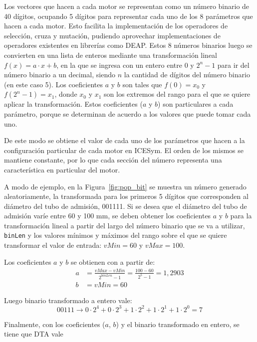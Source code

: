 Los vectores que hacen a cada motor se representan como un número binario de 40
dígitos, ocupando 5 dígitos para representar cada uno de los 8 parámetros que
hacen a cada motor.
%
Esto facilita la implementación de los operadores de selección, cruza y
mutación, pudiendo aprovechar implementaciones de operadores existentes en
librerías como DEAP.
%
Estos 8 números binarios luego se convierten en una lista de enteros mediante
una transformación lineal $f(x)=a\cdot x+b$, en la que se ingresa con un entero
entre 0 y $2^{n}-1$ para ir del número binario a un decimal, siendo $n$ la
cantidad de dígitos del número binario (en este caso 5).
%
Los coeficientes $a$ y $b$ son tales que $f(0)=x_{0}$ y $f(2^{n}-1) = x_{1}$,
donde $x_{0}$ y $x_{1}$ son los extremos del rango para el que se quiere aplicar
la transformación.
%
Estos coeficientes ($a$ y $b$) son particulares a cada parámetro, porque se
determinan de acuerdo a los valores que puede tomar cada uno.

De este modo se obtiene el valor de cada uno de los parámetros que hacen a la
configuración particular de cada motor en ICESym.
%
El orden de los mismos se mantiene constante, por lo que cada sección del número
representa una característica en particular del motor.

A modo de ejemplo, en la Figura~\ref{fig:pop_bit} se muestra un número generado
aleatoriamente, la transformada para los primeros 5 dígitos que corresponden al
diámetro del tubo de admisión, 001111.
%
Si se desea que el diámetro del tubo de admisión varíe entre 60 y 100 mm, se
deben obtener los coeficientes $a$ y $b$ para la transformación lineal  a partir
del largo del número binario que se va a utilizar, {\tt{binLen}} y los valores
mínimos y máximos del rango sobre el que se quiere transformar el valor de
entrada: $vMin=60$ y $vMax=100$.

Los coeficientes $a$ y $b$ se obtienen con a partir de:
\begin{align*}
  a &= \frac{vMax-vMin}{2^{binLen} - 1} =\frac{100-60}{2^{5}-1} = 1,2903\\
  b &= vMin=60
\end{align*}

Luego binario transformado a entero vale:
\begin{equation*}
  00111 \longrightarrow 0\cdot 2^{4} + 0\cdot 2^{3} + 1\cdot 2^{2} + 1\cdot 2^{1} + 1\cdot 2^{0} = 7
\end{equation*}

Finalmente, con los coeficientes ($a$, $b$) y el binario transformado en entero,
se tiene que DTA vale


